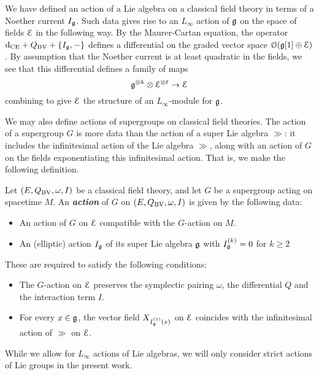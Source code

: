\documentclass[10pt, oneside]{article}
\newcommand{\defterm}[1]{\textbf{\emph{#1}}}
\begin{document}
\begin{remark}
We have defined an action of a Lie algebra on a classical field theory in terms of a Noether current $I_\mathfrak g$.
Such data gives rise to an $L_\infty$ action of $\mathfrak g$ on the space of fields $\mathcal E$ in the following way.
By the Maurer-Cartan equation, the operator ${\rm d}_{\mathrm{CE}} + Q_{\mathrm{BV}} + \{I_\mathfrak g, -\}$ 
defines a differential on the graded vector space $\mathcal O(\mathfrak g[1] \oplus \mathcal E)$. 
By assumption that the Noether current is at least quadratic in the fields, we see that this differential defines a family of maps
\[
\mathfrak g^{\otimes k} \otimes \mathcal E^{\otimes \ell} \to \mathcal E
\]
combining to give $\mathcal E$ the structure of an $L_\infty$-module for $\mathfrak g$.
\end{remark}

We may also define actions of supergroups on classical field theories.  The action of a supergroup $G$ is more data than the action of a super Lie algebra $\gg$: it includes the infinitesimal action of the Lie algebra $\gg$, along with an action of $G$ on the fields exponentiating this infinitesimal action.  That is, we make the following definition.

\begin{definition}
\label{group_action_def}
Let $(E, Q_{\mathrm{BV}}, \omega, I)$ be a classical field theory, and let $G$ be a supergroup acting on spacetime $M$. An \defterm{action} of $G$ on $(E, Q_{\mathrm{BV}}, \omega, I)$ is given by the following data:
\begin{itemize}
\item An action of $G$ on $\mathcal E$ compatible with the $G$-action on $M$.

\item An (elliptic) action $I_\mathfrak g$ of its super Lie algebra $\mathfrak g$ with $I^{(k)}_\mathfrak g = 0$ for $k\geq 2$ 
\end{itemize}
These are required to satisfy the following conditions:
\begin{itemize}
\item The $G$-action on $\mathcal E$ preserves the symplectic pairing $\omega$, the differential $Q$ and the interaction term $I$.

\item For every $x\in\mathfrak g$, the vector field $X_{{I^{(1)}_\mathfrak g}(x)}$ on $\mathcal E$ coincides with the infinitesimal action of $\gg$ on $\mathcal E$.
\end{itemize}
\end{definition}

\begin{remark}
While we allow for $L_\infty$ actions of Lie algebras, we will only consider strict actions of Lie groups in the present work.
\end{remark}
\end{document}
